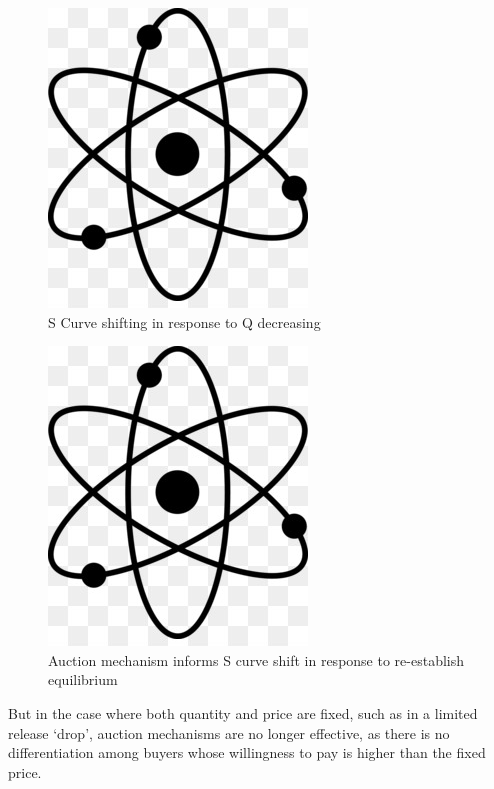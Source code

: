 \documentclass[runningheads]{llncs}
\begin{document}
\begin{figure}[H]
\centering
\includegraphics[scale=0.5]{Figures_and_Tables/atom.png}
\caption{S Curve shifting in response to Q decreasing}
\end{figure}

\begin{figure}[H]
\centering
\includegraphics[scale=0.5]{Figures_and_Tables/atom.png}
\caption{Auction mechanism informs S curve shift in response to re-establish equilibrium}
\end{figure}

But in the case where both quantity and price are fixed, such as in a limited release ‘drop’, auction mechanisms are no longer effective, as there is no differentiation among buyers whose willingness to pay is higher than the fixed price.
\end{document}
